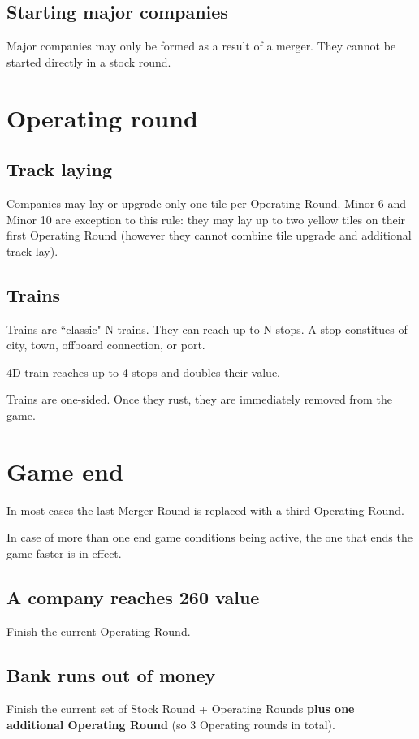 \documentclass[10pt,a4paper,twocolumn]{article}
\begin{document}
\subsection{Starting major companies}
Major companies may only be formed as a result of a merger. They cannot be started directly in a stock round.


\section{Operating round}

\subsection{Track laying}
Companies may lay or upgrade only one tile per Operating Round. Minor 6 and Minor 10 are exception to this rule: they may lay up to two yellow tiles on their first Operating Round (however they cannot combine tile upgrade and additional track lay).


\subsection{Trains}
Trains are ``classic" N-trains. They can reach up to N stops. A stop constitues of city, town, offboard connection, or port.

4D-train reaches up to 4 stops and doubles their value.

Trains are one-sided. Once they rust, they are immediately removed from the game.


\section{Game end}

In most cases the last Merger Round is replaced with a third Operating Round.

In case of more than one end game conditions being active, the one that ends the game faster is in effect.

\subsection{A company reaches 260 value}
Finish the current Operating Round.

\subsection{Bank runs out of money}
Finish the current set of Stock Round + Operating Rounds \textbf{plus one additional Operating Round} (so 3 Operating rounds in total).
\end{document}
